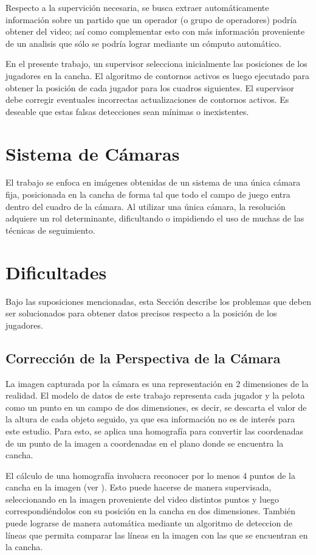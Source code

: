 Respecto a la supervición necesaria, se busca extraer automáticamente
información sobre un partido que un operador (o grupo de operadores) podría
obtener del video; así como complementar esto con más información proveniente
de un analisis que sólo se podría lograr mediante un cómputo automático.

En el presente trabajo, un supervisor selecciona inicialmente las posiciones
de los jugadores en la cancha. El algoritmo de contornos activos es luego
ejecutado para obtener la posición de cada jugador para los cuadros siguientes.
El supervisor debe corregir eventuales incorrectas actualizaciones de contornos
activos. Es deseable que estas falsas detecciones sean mínimas o inexistentes.

\section{Sistema de Cámaras}

El trabajo se enfoca en imágenes obtenidas de un sistema de una única cámara
fija, posicionada en la cancha de forma tal que todo el campo de juego entra
dentro del cuadro de la cámara. Al utilizar una única cámara, la resolución
adquiere un rol determinante, dificultando o impidiendo el uso de muchas de las
técnicas de seguimiento.

\section{Dificultades}

Bajo las suposiciones mencionadas, esta Sección describe los problemas que
deben ser solucionados para obtener datos precisos respecto a la posición
de los jugadores.

\subsection{Corrección de la Perspectiva de la Cámara}

La imagen capturada por la cámara es una representación en 2 dimensiones de la
realidad. El modelo de datos de este trabajo representa cada jugador y la
pelota como un punto en un campo de dos dimensiones, es decir, se descarta el
valor de la altura de cada objeto seguido, ya que esa información no es de
interés para este estudio. Para esto, se aplica una homografía para convertir
las coordenadas de un punto de la imagen a coordenadas en el plano donde se
encuentra la cancha.

El cálculo de una homografía involucra reconocer por lo menos 4 puntos de la
cancha en la imagen (ver \cite{homography-estimation}). Esto puede hacerse de
manera supervisada, seleccionando en la imagen proveniente del video distintos
puntos y luego correspondiéndolos con su posición en la cancha en dos
dimensiones. También puede lograrse de manera automática mediante un algoritmo
de deteccion de líneas que permita comparar las líneas en la imagen con las que
se encuentran en la cancha.

